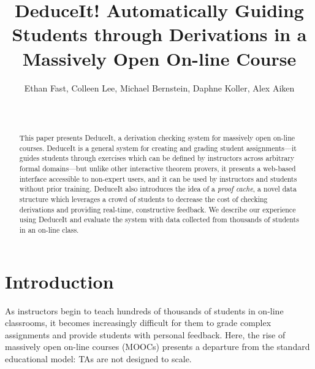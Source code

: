 \documentclass{sigchi}
\begin{document}
\title{DeduceIt! Automatically Guiding Students through Derivations in a Massively Open On-line Course}

\author{
  \alignauthor Ethan Fast, Colleen Lee, Michael Bernstein, Daphne Koller, Alex Aiken\\
    \\
    \\
}

\maketitle

\begin{abstract}
This paper presents DeduceIt, a derivation checking system for massively open on-line courses. DeduceIt is a general system for creating and grading student assignments---it guides students through exercises which can be defined by instructors across arbitrary formal domains---but unlike other interactive theorem provers, it presents a web-based interface accessible to non-expert users, and it can be used by instructors and students without prior training. DeduceIt also introduces the idea of a \textit{proof cache}, a novel data structure which leverages a crowd of students to decrease the cost of checking derivations and providing real-time, constructive feedback. We describe our experience using DeduceIt and evaluate the system with data collected from thousands of students in an on-line class.
\end{abstract}

\keywords{
	\textcolor{red}{What keywords to use?}
}





\section{Introduction}
As instructors begin to teach hundreds of thousands of students in on-line classrooms, it becomes increasingly difficult for them to grade complex assignments and provide students with personal feedback. Here, the rise of massively open on-line courses (MOOCs) presents a departure from the standard educational model: TAs are not designed to scale. 
\end{document}
